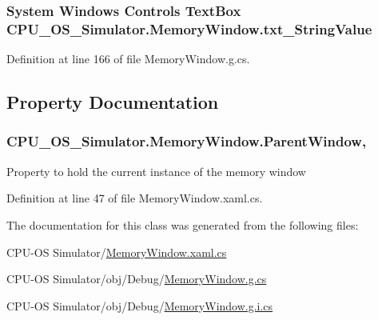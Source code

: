 \subsubsection[{txt\+\_\+\+String\+Value}]{\setlength{\rightskip}{0pt plus 5cm}System Windows Controls Text\+Box C\+P\+U\+\_\+\+O\+S\+\_\+\+Simulator.\+Memory\+Window.\+txt\+\_\+\+String\+Value\hspace{0.3cm}{\ttfamily [package]}}\label{class_c_p_u___o_s___simulator_1_1_memory_window_aca8e57432af036b698d0eeaaa765c483}


Definition at line 166 of file Memory\+Window.\+g.\+cs.



\subsection{Property Documentation}
\hypertarget{class_c_p_u___o_s___simulator_1_1_memory_window_ad61b6543a424be98fd0a4e0fa732f3d4}{}
\subsubsection[{Parent\+Window}]{ C\+P\+U\+\_\+\+O\+S\+\_\+\+Simulator.\+Memory\+Window.\+Parent\+Window\hspace{0.3cm}{\ttfamily [get]}, {\ttfamily [set]}}\label{class_c_p_u___o_s___simulator_1_1_memory_window_ad61b6543a424be98fd0a4e0fa732f3d4}


Property to hold the current instance of the memory window 



Definition at line 47 of file Memory\+Window.\+xaml.\+cs.



The documentation for this class was generated from the following files\+:\begin{DoxyCompactItemize}
\item 
C\+P\+U-\/\+O\+S Simulator/\hyperlink{_memory_window_8xaml_8cs}{Memory\+Window.\+xaml.\+cs}\item 
C\+P\+U-\/\+O\+S Simulator/obj/\+Debug/\hyperlink{_memory_window_8g_8cs}{Memory\+Window.\+g.\+cs}\item 
C\+P\+U-\/\+O\+S Simulator/obj/\+Debug/\hyperlink{_memory_window_8g_8i_8cs}{Memory\+Window.\+g.\+i.\+cs}\end{DoxyCompactItemize}
